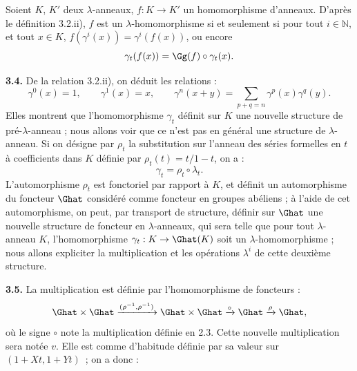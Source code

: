 Soient \(K\), \(K'\) deux \(\lambda\)-anneaux, \(f:K\to K'\) un homomorphisme d'anneaux. D'après le définition 3.2.ii), \(f\) est un \(\lambda\)-homomorphisme si et seulement si pour tout \(i\in\mathbb N\), et tout \(x\in K\), \(f(\gamma^i(x))=\gamma^i(f(x))\), ou encore
\[
  \gamma_t(f(x))=\Gg(f)\circ\gamma_t(x).
\]

\textbf{3.4.} De la relation 3.2.ii), on déduit les relations :
\begin{equation}\tag{3.4.1}
  \gamma^0(x)=1,
  \qquad \gamma^1(x)=x,
  \qquad \gamma^n(x+y)=\sum_{p+q=n}\gamma^p(x)\gamma^q(y).
\end{equation}
Elles montrent que l'homomorphisme \(\gamma_t\) définit sur \(K\) une nouvelle structure de pré-\(\lambda\)-anneau ; nous allons voir que ce n'est pas en général une structure de \(\lambda\)-anneau. Si on désigne par \(\rho_t\) la substitution sur l'anneau des séries formelles en \(t\) à coefficients dans \(K\) définie par \(\rho_t(t)=t/1-t\), on a :
\[
  \gamma_t=\rho_t\circ\lambda_t.
\]
L'automorphisme \(\rho_t\) est fonctoriel par rapport à \(K\), et définit un automorphisme du foncteur \(\Ghat\) considéré comme foncteur en groupes abéliens ; à l'aide de cet automorphisme, on peut, par transport de structure, définir sur \(\Ghat\) une nouvelle structure de foncteur en \(\lambda\)-anneaux, qui sera telle que pour tout \(\lambda\)-anneau \(K\), l'homomorphisme \(\gamma_t:K\to\Ghat(K)\) soit un \(\lambda\)-homomorphisme ; nous allons expliciter la multiplication et les opérations \(\lambda^i\) de cette deuxième structure.

\textbf{3.5.} La multiplication est définie par l'homomorphisme de foncteurs :
\[
  \Ghat\times\Ghat\xrightarrow{(\rho^{-1},\rho^{-1})}
  \Ghat\times\Ghat\xrightarrow{\circ}\Ghat\xrightarrow{\rho}\Ghat ,
\]
où le signe \(\circ\) note la multiplication définie en 2.3. Cette nouvelle multiplication sera notée \(v\). Elle est comme d'habitude définie par sa valeur sur \((1+Xt,1+Yt)\)~; on a donc :
